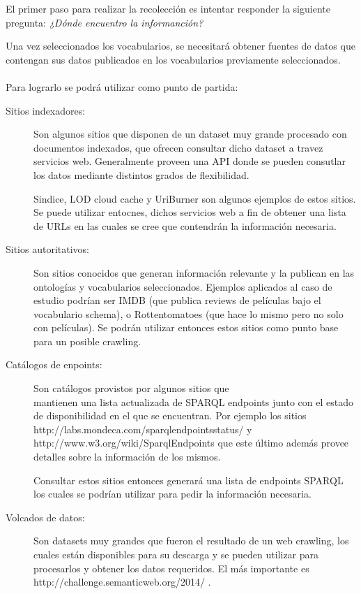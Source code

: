 El primer paso para realizar la recolección es intentar responder la siguiente pregunta: \textit{¿Dónde encuentro la informanción?}

Una vez seleccionados los vocabularios, se necesitará obtener fuentes de datos que contengan sus datos publicados en los vocabularios previamente seleccionados.
 \\\\
Para lograrlo se podrá utilizar como punto de partida:
\begin{description}
\item[Sitios indexadores:] Son algunos sitios que disponen de un dataset muy grande procesado con documentos indexados, que ofrecen consultar dicho 
dataset a travez servicios web. Generalmente proveen una API donde se pueden consutlar los datos mediante distintos grados de flexibilidad.

Sindice, LOD cloud cache y UriBurner son algunos ejemplos de estos sitios. Se puede utilizar entocnes, dichos servicios web a fin
de obtener una lista de URLs en las cuales se cree que contendrán la información necesaria.

\item[Sitios autoritativos:] Son sitios conocidos que generan información relevante y la publican en las ontologías y vocabularios 
seleccionados. Ejemplos aplicados al caso de estudio podrían ser IMDB (que publica reviews de películas bajo el vocabulario schema), o Rottentomatoes
(que hace lo mismo pero no solo con películas). Se podrán utilizar entonces estos sitios como punto base para un posible crawling.

\item[Catálogos de enpoints:] Son catálogos provistos por algunos sitios que \\\noindent mantienen una lista actualizada de SPARQL endpoints 
junto con el estado de disponibilidad en el que se encuentran. Por ejemplo los sitios \\\noindent http://labs.mondeca.com/sparqlendpointsstatus/ y 
\\\noindent http://www.w3.org/wiki/SparqlEndpoints que este último además provee detalles sobre la información de los mismos.

Consultar estos sitios entonces generará una lista de endpoints SPARQL los cuales se podrían utilizar para pedir la información necesaria.

\item[Volcados de datos:] Son datasets muy grandes que fueron el resultado de un web crawling, los cuales están disponibles para su descarga 
y se pueden utilizar para procesarlos y obtener los datos requeridos. El más importante es http://challenge.semanticweb.org/2014/ .
\end{description}
